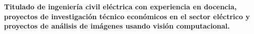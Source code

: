 \sectionsep
\begingroup
\fontsize{12pt}{14pt}\selectfont
\textbf{Titulado de ingeniería civil eléctrica con experiencia en docencia, proyectos de investigación técnico económicos en el sector eléctrico y proyectos de análisis de imágenes usando visión computacional.}
\endgroup
\sectionsep